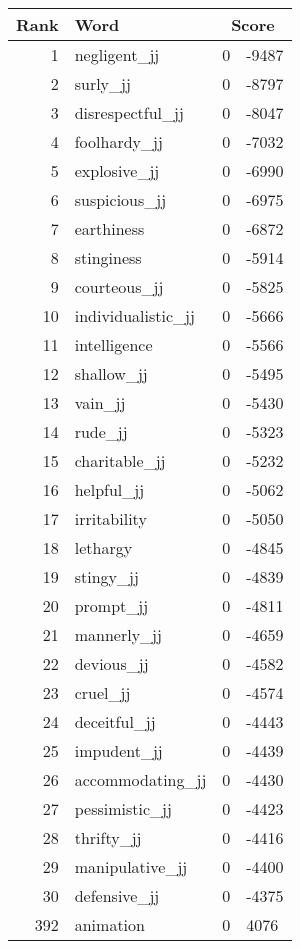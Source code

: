 \begin{longtable}[!htbp]{| rlr@{.}l |}
    \hline
    \textbf{Rank} & \textbf{Word} & \multicolumn{2}{c|}{\textbf{Score}} \\
    \hline
    \endhead
    1 & negligent\_jj & 0 & -9487 \\
    2 & surly\_jj & 0 & -8797 \\
    3 & disrespectful\_jj & 0 & -8047 \\
    4 & foolhardy\_jj & 0 & -7032 \\
    5 & explosive\_jj & 0 & -6990 \\
    6 & suspicious\_jj & 0 & -6975 \\
    7 & earthiness & 0 & -6872 \\
    8 & stinginess & 0 & -5914 \\
    9 & courteous\_jj & 0 & -5825 \\
    10 & individualistic\_jj & 0 & -5666 \\
    11 & intelligence & 0 & -5566 \\
    12 & shallow\_jj & 0 & -5495 \\
    13 & vain\_jj & 0 & -5430 \\
    14 & rude\_jj & 0 & -5323 \\
    15 & charitable\_jj & 0 & -5232 \\
    16 & helpful\_jj & 0 & -5062 \\
    17 & irritability & 0 & -5050 \\
    18 & lethargy & 0 & -4845 \\
    19 & stingy\_jj & 0 & -4839 \\
    20 & prompt\_jj & 0 & -4811 \\
    21 & mannerly\_jj & 0 & -4659 \\
    22 & devious\_jj & 0 & -4582 \\
    23 & cruel\_jj & 0 & -4574 \\
    24 & deceitful\_jj & 0 & -4443 \\
    25 & impudent\_jj & 0 & -4439 \\
    26 & accommodating\_jj & 0 & -4430 \\
    27 & pessimistic\_jj & 0 & -4423 \\
    28 & thrifty\_jj & 0 & -4416 \\
    29 & manipulative\_jj & 0 & -4400 \\
    30 & defensive\_jj & 0 & -4375 \\
    392 & animation & 0 & 4076 \\

\end{longtable}
